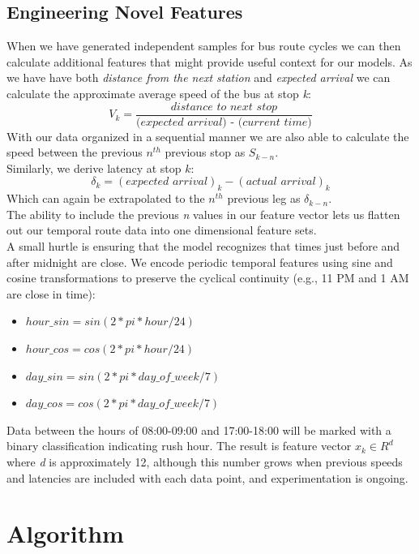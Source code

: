 \documentclass[sigconf]{acmart}
\begin{document}
\subsection{Engineering Novel Features}
When we have generated independent samples for bus route cycles we can then calculate additional features that might provide useful context for our models. As we have have both \textit{distance from the next station} and \textit{expected arrival} we can calculate the approximate average speed of the bus at stop \textit{k}:
$$V_{k} = \frac{\textit{distance to next stop}}{\textit{(expected arrival) - (current time)}}$$
With our data organized in a sequential manner we are also able to calculate the speed between the previous $\textit{n}^{th} $ previous stop as $S_{k-n}$.\\
Similarly, we derive latency at stop $\textit{k}$:
$$\delta_k = (\textit{expected arrival})_k - (\textit{actual arrival})_k$$
Which can again be extrapolated to the $\textit{n}^{th}$ previous leg as $\delta_{k-n}$.\\
The ability to include the previous \textit{n} values in our feature vector lets us flatten out our temporal route data into one dimensional feature sets.\\
A small hurtle is ensuring that the model recognizes that times just before and after midnight are close. We encode periodic
temporal features using sine and cosine transformations to preserve the cyclical continuity (e.g., 11 PM and 1 AM are close in time):

\begin{itemize}
    \item $hour\_sin = sin(2 * pi * hour / 24)$
    \item $hour\_cos = cos(2 * pi * hour / 24)$
    \item $day\_sin = sin(2 * pi * day\_of\_week / 7)$
    \item $day\_cos = cos(2 * pi * day\_of\_week / 7)$
\end{itemize}

Data between the hours of 08:00-09:00 and 17:00-18:00 will be marked with a binary classification indicating rush hour.
The result is feature vector $x_k \in R^d$ where \textit{d} is approximately 12, although this number grows when previous speeds and latencies are included with each data point, and experimentation is ongoing.

\section{Algorithm}
\end{document}
